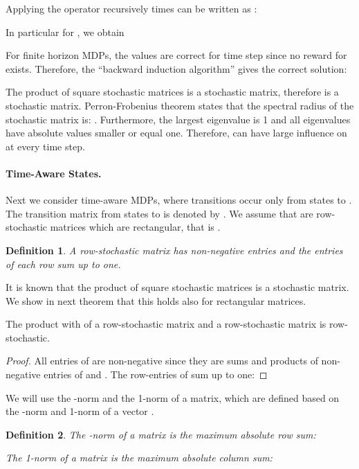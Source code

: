 \documentclass{article}
\newtheorem{definitionA}{Definition}
\begin{document}
\begin{appendices}
Applying the operator  recursively
 times can be written as \cite{Bertsekas:91}:

In particular for , we obtain

For finite horizon MDPs,
the values  are correct for time step  since
no reward for  exists. Therefore, the 
``backward induction algorithm'' \cite{Puterman:90,Puterman:05} gives
the correct solution:

The product of square stochastic matrices is a stochastic matrix,
therefore  is a stochastic matrix.
Perron-Frobenius theorem states that the spectral radius
 of the stochastic matrix  is: .
Furthermore, the largest eigenvalue is 1 and all
eigenvalues have absolute values smaller or equal one.
Therefore,  can have large influence on  at every time step. 




\paragraph{Time-Aware States.}

Next we consider time-aware MDPs, where transitions occur only from
states  to . The transition matrix from
states  to  is denoted by . We assume that
 are row-stochastic matrices which are rectangular, that is
.
\begin{definitionA}
A row-stochastic matrix  has
non-negative entries and the entries of each row sum up to one.
\end{definitionA}
It is known that the product of
square stochastic matrices   is a
stochastic matrix. We show in next theorem
that this holds also for rectangular matrices.
\begin{lemmaA}
\label{th:ArowStochastic}
  The product  with 
  of a row-stochastic matrix 
and a row-stochastic matrix  is row-stochastic.
\end{lemmaA}

\begin{proof}
  All entries of  are non-negative since they are sums and
  products of non-negative entries of  and
  .
  The row-entries of  sum up to one:
   
\end{proof}


We will use the -norm and the
1-norm of a matrix, which are defined based on the
-norm  and 1-norm 
of a vector .
\begin{definitionA}
The -norm of a matrix is the maximum absolute row sum: 
 
The 1-norm of a matrix is the maximum absolute column sum: 
 

\end{definitionA}
\end{appendices}
\end{document}
